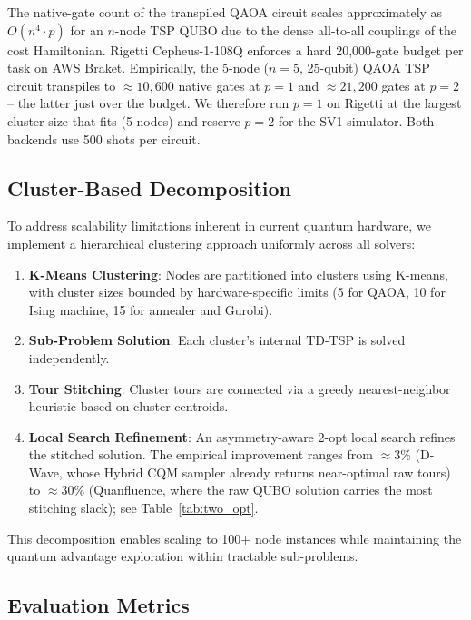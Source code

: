 \documentclass[conference]{IEEEtran}
\begin{document}
The native-gate count of the transpiled QAOA circuit scales approximately as $O(n^4 \cdot p)$ for an $n$-node TSP QUBO due to the dense all-to-all couplings of the cost Hamiltonian. Rigetti Cepheus-1-108Q enforces a hard 20{,}000-gate budget per task on AWS Braket. Empirically, the 5-node ($n=5$, 25-qubit) QAOA TSP circuit transpiles to $\approx 10{,}600$ native gates at $p=1$ and $\approx 21{,}200$ gates at $p=2$ -- the latter just over the budget. We therefore run $p=1$ on Rigetti at the largest cluster size that fits (5 nodes) and reserve $p=2$ for the SV1 simulator. Both backends use 500 shots per circuit.

\subsection{Cluster-Based Decomposition} \label{2-opt}

To address scalability limitations inherent in current quantum hardware, we implement a hierarchical clustering approach uniformly across all solvers:

\begin{enumerate}
\item \textbf{K-Means Clustering}: Nodes are partitioned into clusters using K-means, with cluster sizes bounded by hardware-specific limits (5 for QAOA, 10 for Ising machine, 15 for annealer and Gurobi).
\item \textbf{Sub-Problem Solution}: Each cluster's internal TD-TSP is solved independently.
\item \textbf{Tour Stitching}: Cluster tours are connected via a greedy nearest-neighbor heuristic based on cluster centroids.
\item \textbf{Local Search Refinement}: An asymmetry-aware 2-opt local search refines the stitched solution. The empirical improvement ranges from $\approx$3\% (D-Wave, whose Hybrid CQM sampler already returns near-optimal raw tours) to $\approx$30\% (Quanfluence, where the raw QUBO solution carries the most stitching slack); see Table~\ref{tab:two_opt}.
\end{enumerate}

This decomposition enables scaling to 100+ node instances while maintaining the quantum advantage exploration within tractable sub-problems.

\subsection{Evaluation Metrics}
\end{document}
